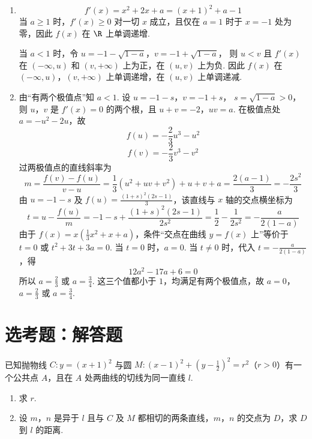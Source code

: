 \begin{solution}
\begin{enumerate}
\item
\[
f'(x)=x^2+2x+a=(x+1)^2+a-1
\]
当 \(a\geqslant1\) 时，\(f'(x)\geqslant0\) 对一切 \(x\) 成立，且仅在 \(a=1\) 时于 \(x=-1\) 处为零，因此 \(f(x)\) 在 \(\R\) 上单调递增.

当 \(a<1\) 时，令 \(u=-1-\sqrt{1-a}\)，\(v=-1+\sqrt{1-a}\)，
则 \(u<v\) 且 \(f'(x)\) 在 \((-\infty,u)\) 和 \((v,+\infty)\) 上为正，在 \((u,v)\) 上为负. 因此 \(f(x)\) 在 \((-\infty,u)\)，\((v,+\infty)\) 上单调递增，在 \((u,v)\) 上单调递减.

\item 由“有两个极值点”知 \(a<1\). 设 \(u=-1-s\)，\(v=-1+s\)，
\(s=\sqrt{1-a}>0\)，
则 \(u\)，\(v\) 是 \(f'(x)=0\) 的两个根，且 \(u+v=-2\)，\(uv=a\). 在极值点处 \(a=-u^2-2u\)，故
\[
f(u)=-\frac23u^3-u^2
\]
\[
f(v)=-\frac23v^3-v^2
\]
过两极值点的直线斜率为
\[
m=\frac{f(v)-f(u)}{v-u}
=\frac13(u^2+uv+v^2)+u+v+a
=\frac{2(a-1)}3=-\frac{2s^2}{3}
\]
由 \(u=-1-s\) 及 \(f(u)=\frac{(1+s)^2(2s-1)}3\)，该直线与 \(x\) 轴的交点横坐标为
\[
t=u-\frac{f(u)}m
=-1-s+\frac{(1+s)^2(2s-1)}{2s^2}
=\frac12-\frac{1}{2s^2}
=-\frac{a}{2(1-a)}
\]
由于 \(f(x)=x\left(\frac13x^2+x+a\right)\)，条件“交点在曲线 \(y=f(x)\) 上”等价于
\(t=0\) 或 \(t^2+3t+3a=0\).
当 \(t=0\) 时，\(a=0\). 当 \(t\ne0\) 时，代入 \(t=-\frac{a}{2(1-a)}\)，得
\[
12a^2-17a+6=0
\]
所以 \(a=\frac23\) 或 \(a=\frac34\).
这三个值都小于 \(1\)，均满足有两个极值点，故 \(a=0\)，\(a=\frac23\) 或 \(a=\frac34\).
\end{enumerate}
\end{solution}

\section{选考题：解答题}

\begin{problem}
已知抛物线 \(C: y = (x + 1)^2\) 与圆 \(M: (x - 1)^2 + (y - \frac{1}{2})^2 = r^2\)（\(r > 0\)）有一个公共点 \(A\)，且在 \(A\) 处两曲线的切线为同一直线 \(l\).
\begin{enumerate}
\item 求 \(r\).
\item 设 \(m\)，\(n\) 是异于 \(l\) 且与 \(C\) 及 \(M\) 都相切的两条直线，\(m\)，\(n\) 的交点为 \(D\)，求 \(D\) 到 \(l\) 的距离.
\end{enumerate}
\end{problem}

